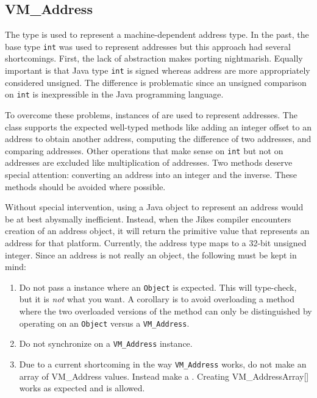 \subsection{VM\_Address}
The type  is used to represent a machine-dependent
address type.  In the past, the base type {\tt int} was used to
represent addresses but this approach had several shortcomings.
First, the lack of abstraction makes porting nightmarish.  Equally
important is that Java type {\tt int} is signed whereas address are
more appropriately considered unsigned.  The difference is problematic
since an unsigned comparison on {\tt int} is inexpressible in the Java
programming language.

To overcome these problems, instances of  are used to
represent addresses.  The class supports the expected well-typed
methods like adding an integer offset to an address to obtain another
address, computing the difference of two addresses, and comparing
addresses.  Other operations that make sense on {\tt int} but not on
addresses are excluded like multiplication of addresses.  Two methods
deserve special attention: converting an address into an integer and
the inverse.  These methods should be avoided where possible.

Without special intervention, using a Java object to represent an
address would be at best abysmally inefficient.  Instead, when the
Jikes compiler encounters creation of an address object, it will
return the primitive value that represents an address for that
platform.  Currently, the address type maps to a 32-bit unsigned
integer.  Since an address is not really an object, the following must
be kept in mind:

\begin{enumerate}
\item{} Do not pass a   instance where an {\tt Object}
is expected. This will type-check, but it is {\em not} what you want.  A
corollary is to avoid overloading a method where the two overloaded
versions of the method can only be distinguished by operating on an
{\tt Object}  versus a {\tt VM\_Address}. 
\item{} Do not synchronize on a {\tt VM\_Address} instance.
\item{} Due to a current shortcoming in the way {\tt VM\_Address} works, do not make an
array of {VM\_Address} values.  Instead make a
.
  Creating {VM\_AddressArray[]} works as expected and is allowed.
\end{enumerate}


